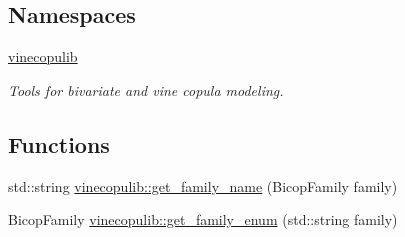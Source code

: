 \subsection*{Namespaces}
\begin{DoxyCompactItemize}
\item 
 \hyperlink{namespacevinecopulib}{vinecopulib}
\begin{DoxyCompactList}\small\item\em Tools for bivariate and vine copula modeling. \end{DoxyCompactList}\end{DoxyCompactItemize}
\subsection*{Functions}
\begin{DoxyCompactItemize}
\item 
std\+::string \hyperlink{namespacevinecopulib_ac46553ae5f99072f65e9d3254d2c526d}{vinecopulib\+::get\+\_\+family\+\_\+name} (Bicop\+Family family)
\item 
Bicop\+Family \hyperlink{namespacevinecopulib_a8d5285a58e0d250a5226715754e12568}{vinecopulib\+::get\+\_\+family\+\_\+enum} (std\+::string family)
\end{DoxyCompactItemize}

